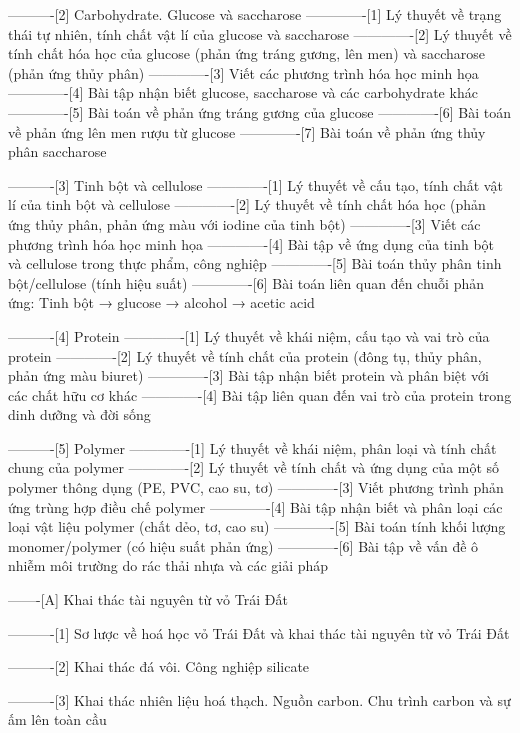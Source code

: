 ----------[2] Carbohydrate. Glucose và saccharose
-------------[1] Lý thuyết về trạng thái tự nhiên, tính chất vật lí của glucose và saccharose
-------------[2] Lý thuyết về tính chất hóa học của glucose (phản ứng tráng gương, lên men) và saccharose (phản ứng thủy phân)
-------------[3] Viết các phương trình hóa học minh họa
-------------[4] Bài tập nhận biết glucose, saccharose và các carbohydrate khác
-------------[5] Bài toán về phản ứng tráng gương của glucose
-------------[6] Bài toán về phản ứng lên men rượu từ glucose
-------------[7] Bài toán về phản ứng thủy phân saccharose

----------[3] Tinh bột và cellulose
-------------[1] Lý thuyết về cấu tạo, tính chất vật lí của tinh bột và cellulose
-------------[2] Lý thuyết về tính chất hóa học (phản ứng thủy phân, phản ứng màu với iodine của tinh bột)
-------------[3] Viết các phương trình hóa học minh họa
-------------[4] Bài tập về ứng dụng của tinh bột và cellulose trong thực phẩm, công nghiệp
-------------[5] Bài toán thủy phân tinh bột/cellulose (tính hiệu suất)
-------------[6] Bài toán liên quan đến chuỗi phản ứng: Tinh bột → glucose → alcohol → acetic acid

----------[4] Protein
-------------[1] Lý thuyết về khái niệm, cấu tạo và vai trò của protein
-------------[2] Lý thuyết về tính chất của protein (đông tụ, thủy phân, phản ứng màu biuret)
-------------[3] Bài tập nhận biết protein và phân biệt với các chất hữu cơ khác
-------------[4] Bài tập liên quan đến vai trò của protein trong dinh dưỡng và đời sống

----------[5] Polymer
-------------[1] Lý thuyết về khái niệm, phân loại và tính chất chung của polymer
-------------[2] Lý thuyết về tính chất và ứng dụng của một số polymer thông dụng (PE, PVC, cao su, tơ)
-------------[3] Viết phương trình phản ứng trùng hợp điều chế polymer
-------------[4] Bài tập nhận biết và phân loại các loại vật liệu polymer (chất dẻo, tơ, cao su)
-------------[5] Bài toán tính khối lượng monomer/polymer (có hiệu suất phản ứng)
-------------[6] Bài tập về vấn đề ô nhiễm môi trường do rác thải nhựa và các giải pháp

-------[A] Khai thác tài nguyên từ vỏ Trái Đất

----------[1] Sơ lược về hoá học vỏ Trái Đất và khai thác tài nguyên từ vỏ Trái Đất

----------[2] Khai thác đá vôi. Công nghiệp silicate

----------[3] Khai thác nhiên liệu hoá thạch. Nguồn carbon. Chu trình carbon và sự ấm lên toàn cầu

